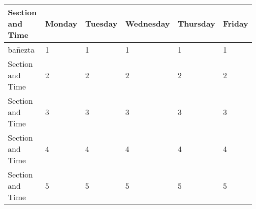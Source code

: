 \def \firstPeriod{1}
\def \secondPeriod{2}
\def \thirdPeriod{3}
\def \fourthPeriod{4}
\def \fifthPeriod{5}
\def \sixthPeriod{6}

\noindent\begin{minipage}[c]{\textwidth}
\begin{center}
  \begin{tabular}{ *{6}{|C{120pt}}|  }
    \hline
   \textbf{ Section and Time} & \textbf{Monday} & \textbf{Tuesday} & \textbf{Wednesday} & \textbf{Thursday} & \textbf{Friday} \\
    \hline
        bañezta & \firstPeriod & \firstPeriod & \firstPeriod & \firstPeriod & \firstPeriod \\
    \hline
        Section and Time & \secondPeriod & \secondPeriod & \secondPeriod & \secondPeriod & \secondPeriod \\
    \hline
        Section and Time & \thirdPeriod & \thirdPeriod & \thirdPeriod & \thirdPeriod & \thirdPeriod \\
    \hline
        Section and Time & \fourthPeriod & \fourthPeriod & \fourthPeriod & \fourthPeriod & \fourthPeriod \\
    \hline
        Section and Time & \fifthPeriod & \fifthPeriod & \fifthPeriod & \fifthPeriod & \fifthPeriod \\
  \hline
 \end{tabular}
\end{center}
\end{minipage}
